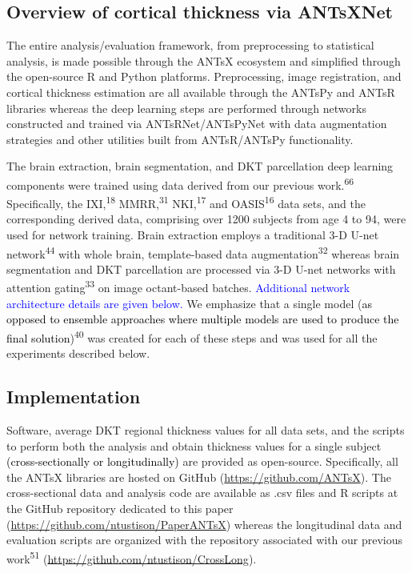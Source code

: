 \documentclass[
  12pt,
]{article}
\begin{document}
\hypertarget{overview-of-cortical-thickness-via-antsxnet}{%
\subsection*{Overview of cortical thickness via
ANTsXNet}\label{overview-of-cortical-thickness-via-antsxnet}}

The entire analysis/evaluation framework, from preprocessing to
statistical analysis, is made possible through the ANTsX ecosystem and
simplified through the open-source R and Python platforms.
Preprocessing, image registration, and cortical thickness estimation are
all available through the ANTsPy and ANTsR libraries whereas the deep
learning steps are performed through networks constructed and trained
via ANTsRNet/ANTsPyNet with data augmentation strategies and other
utilities built from ANTsR/ANTsPy functionality.

The brain extraction, brain segmentation, and DKT parcellation deep
learning components were trained using data derived from our previous
work.\textsuperscript{66} Specifically, the IXI,\textsuperscript{18}
MMRR,\textsuperscript{31} NKI,\textsuperscript{17} and
OASIS\textsuperscript{16} data sets, and the corresponding derived data,
comprising over 1200 subjects from age 4 to 94, were used for network
training. Brain extraction employs a traditional 3-D U-net
network\textsuperscript{44} with whole brain, template-based data
augmentation\textsuperscript{32} whereas brain segmentation and DKT
parcellation are processed via 3-D U-net networks with attention
gating\textsuperscript{33} on image octant-based batches.
\textcolor{blue}{Additional network architecture details are given below.}
We emphasize that a single model
(\textcolor{black}{as opposed to ensemble
approaches where multiple models are used to produce the final solution})\textsuperscript{40}
was created for each of these steps and was used for all the experiments
described below.

\hypertarget{implementation}{%
\subsection*{Implementation}\label{implementation}}

Software, average DKT regional thickness values for all data sets, and
the scripts to perform both the analysis and obtain thickness values for
a single subject
\textcolor{black}{(cross-sectionally or longitudinally)} are provided as
open-source. Specifically, all the ANTsX libraries are hosted on GitHub
(\url{https://github.com/ANTsX}). The cross-sectional data and analysis
code are available as .csv files and R scripts at the GitHub repository
dedicated to this paper (\url{https://github.com/ntustison/PaperANTsX})
whereas the longitudinal data and evaluation scripts are organized with
the repository associated with our previous work\textsuperscript{51}
(\url{https://github.com/ntustison/CrossLong}).
\end{document}
